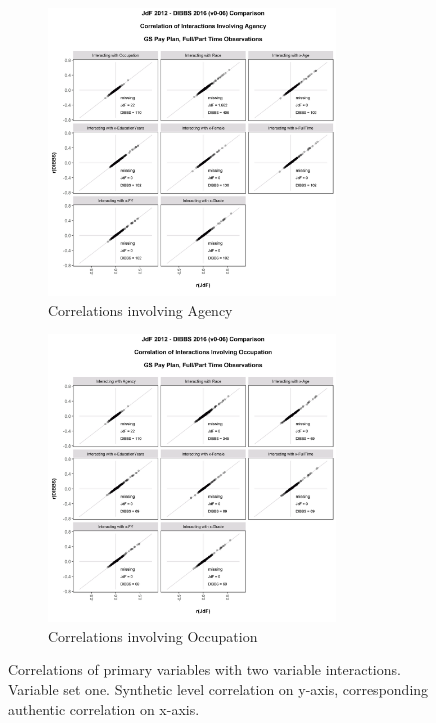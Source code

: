 \documentclass[10pt, letterpaper]{article}
\begin{document}
\begin{spacing}{1.0}
\begin{figure}[ht]
    \begin{subfigure}{.5\textwidth}
        \centering
        \includegraphics[width=3in, trim={0 0.25in 0 1in}, clip]{JdFDIBBSCorrelationInteraction-Agency.png}
        \caption{Correlations involving Agency}
        \vspace{10pt}
    \end{subfigure}%
    \begin{subfigure}{.5\textwidth}
        \centering
        \includegraphics[width=3in, trim={0 0.25in 0 1in}, clip]{JdFDIBBSCorrelationInteraction-Occupation.png}
        \caption{Correlations involving Occupation}
        \vspace{10pt}
    \end{subfigure}
    \caption{Correlations of primary variables with two variable interactions.  Variable set one.  Synthetic level correlation on y-axis, corresponding authentic correlation on x-axis.}
    \label{figure:JdFDIBBSCorrelationInteraction}
\end{figure}


\end{spacing}
\end{document}
